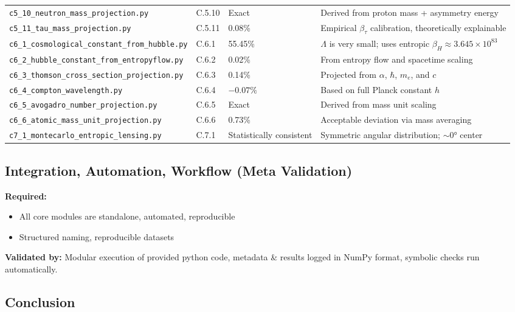 \documentclass[10.5pt,a4paper]{article}
\begin{document}
{\begin{longtable}{p{7.5cm}p{1.5cm}p{2cm}p{5.5cm}}
\texttt{c5\_10\_neutron\_mass\_projection.py} & C.5.10 & Exact & Derived from proton mass + asymmetry energy \\
\texttt{c5\_11\_tau\_mass\_projection.py} & C.5.11 & 0.08\% & Empirical $\beta_\tau$ calibration, theoretically explainable \\
\texttt{c6\_1\_cosmological\_constant\_from\_hubble.py} & C.6.1 & 55.45\% & $\Lambda$ is very small; uses entropic $\beta_H \approx 3.645 \times 10^{83}$ \\
\texttt{c6\_2\_hubble\_constant\_from\_entropyflow.py} & C.6.2 & 0.02\% & From entropy flow and spacetime scaling \\
\texttt{c6\_3\_thomson\_cross\_section\_projection.py} & C.6.3 & 0.14\% & Projected from $\alpha$, $\hbar$, $m_e$, and $c$ \\
\texttt{c6\_4\_compton\_wavelength.py} & C.6.4 & $-0.07\%$ & Based on full Planck constant $h$ \\
\texttt{c6\_5\_avogadro\_number\_projection.py} & C.6.5 & Exact & Derived from mass unit scaling \\
\texttt{c6\_6\_atomic\_mass\_unit\_projection.py} & C.6.6 & 0.73\% & Acceptable deviation via mass averaging \\
\texttt{c7\_1\_montecarlo\_entropic\_lensing.py} & C.7.1 & Statistically consistent & Symmetric angular distribution; $\sim$0° center \\
\hline
\end{longtable}
}
\subsection{Integration, Automation, Workflow (Meta Validation)}

\textbf{Required:}
\begin{itemize}
    \item All core modules are standalone, automated, reproducible
    \item Structured naming, reproducible datasets
\end{itemize}

\textbf{Validated by:} Modular execution of provided python code, metadata \& results logged in NumPy format, symbolic checks run automatically.

\subsection{Conclusion}
\end{document}
